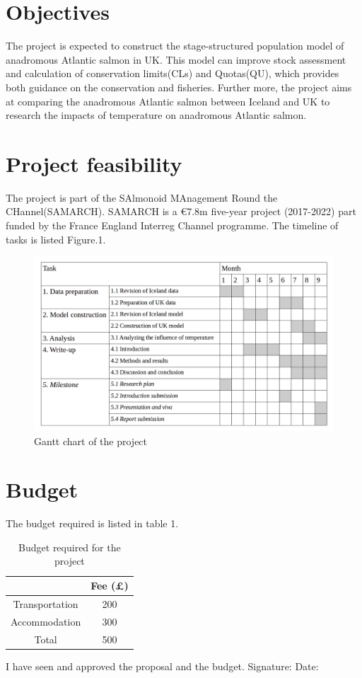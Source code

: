 \documentclass[11pt]{article}
\begin{document}
\begin{linenumbers}
\section{Objectives}
The project is expected to construct the stage-structured population model of anadromous Atlantic salmon in UK. This model can improve stock assessment and calculation of conservation limits(CLs) and Quotas(QU), which provides both guidance on the conservation and fisheries. Further more, the project aims at comparing the anadromous Atlantic salmon between Iceland and UK to research the impacts of temperature on anadromous Atlantic salmon. 

\section{Project feasibility}
The project is part of the SAlmonoid MAnagement Round the CHannel(SAMARCH). SAMARCH is a €7.8m five-year project (2017-2022) part funded by the France England Interreg Channel programme. 
The timeline of tasks is listed Figure.1.
\begin{figure}[H]
   \includegraphics[width=\textwidth]{gantt_chart.png}
   \caption{Gantt chart of the project}
\end{figure}

\section{Budget}
The budget required is listed in table 1.
\begin{table}[H]
\centering
\begin{tabular}{ |c | c |}
 \hline
 &  Fee (\pounds)    \\
 \hline
 Transportation & 200     \\
 \hline
 Accommodation & 300     \\
 \hline
 Total & 500  \\
 \hline
\end{tabular}
\caption{Budget required for the project}
\end{table}

\newpage



\end{linenumbers}


\newpage
\LARGE
I have seen and approved the proposal and the budget.
\bigbreak
\bigbreak
\bigbreak
\bigbreak
\large
Signature:
\bigbreak
\bigbreak
Date:
\end{document}

